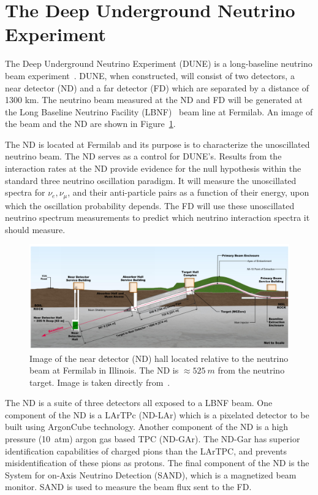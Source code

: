 \section{The Deep Underground Neutrino Experiment}
\label{sec:dune}
The Deep Underground Neutrino Experiment (DUNE) is a long-baseline neutrino beam experiment~\citep{DUNE_TDR_V1_Abi_2020, DUNE_FD_TDRv2_2020, DUNE_TDRv3_Abi_2020, DUNE-FD_TDRv4:Abi_2020}.
DUNE, when constructed, will consist of two detectors, a near detector (ND) and a far detector (FD) which are separated by a distance of 1300 km.
The neutrino beam measured at the ND and FD will be generated at the Long Baseline Neutrino Facility (LBNF)~\citep{dune_cdr_2016_arxiv} beam line at Fermilab.
An image of the beam and the ND are shown in Figure~\ref{fig:dune_nd_beamline}.

The ND is located at Fermilab and its purpose is to characterize the unoscillated neutrino beam.
The ND serves as a control for DUNE's.
Results from the interaction rates at the ND provide evidence for the null hypothesis within the standard three neutrino oscillation paradigm.
It will measure the unoscillated spectra for $\nu_{e}, \nu_{\mu}$, and their anti-particle pairs as a function of their energy, upon which the oscillation probability depends.
The FD will use these unoscillated neutrino spectrum measurements to predict which neutrino interaction spectra it should measure.

\begin{figure}[]
\centering
\includegraphics[width=\textwidth]{images/dune_nd_beamline_tdrv1.png}
\caption{Image of the near detector (ND) hall located relative to the neutrino beam at Fermilab in Illinois.
The ND is $\approx 525~\unit{m}$ from the neutrino target.
Image is taken directly from~\citep{DUNE_TDR_V1_Abi_2020}.
}
\label{fig:dune_nd_beamline}
\end{figure}

The ND is a suite of three detectors all exposed to a LBNF beam.
One component of the ND is a LArTPc (ND-LAr) which is a pixelated detector to be built using ArgonCube technology.
Another component of the ND is a high pressure (10~\unit{atm}) argon gas based TPC (ND-GAr).
The ND-Gar has superior identification capabilities of charged pions than the LArTPC, and prevents misidentification of these pions as protons.
The final component of the ND is the System for on-Axis Neutrino Detection (SAND), which is a magnetized beam monitor.
SAND is used to measure the beam flux sent to the FD.

